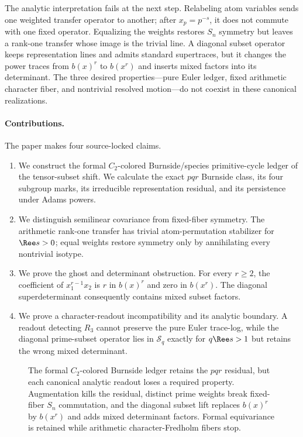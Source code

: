 The analytic interpretation fails at the next step.  Relabeling atom
variables sends one weighted transfer operator to another; after
$x_p=p^{-s}$, it does not commute with one fixed operator.  Equalizing the
weights restores $S_n$ symmetry but leaves a rank-one transfer whose image is
the trivial line.  A diagonal subset operator keeps representation lines and
admits standard supertraces, but it changes the power traces from $b(x)^r$ to
$b(x^r)$ and inserts mixed factors into its determinant.  The three desired
properties---pure Euler ledger, fixed arithmetic character fiber, and
nontrivial resolved motion---do not coexist in these canonical realizations.

\paragraph{Contributions.}
The paper makes four source-locked claims.

\begin{enumerate}
\item We construct the formal $C_2$-colored Burnside/species primitive-cycle
  ledger of the tensor-subset shift.  We calculate the exact $pqr$ Burnside
  class, its four subgroup marks, its irreducible representation residual,
  and its persistence under Adams powers.
\item We distinguish semilinear covariance from fixed-fiber symmetry.  The
  arithmetic rank-one transfer has trivial atom-permutation stabilizer for
  $\Ree s>0$; equal weights restore symmetry only by annihilating every
  nontrivial isotype.
\item We prove the ghost and determinant obstruction.  For every $r\ge2$,
  the coefficient of $x_1^{r-1}x_2$ is $r$ in $b(x)^r$ and zero in $b(x^r)$.
  The diagonal superdeterminant consequently contains mixed subset factors.
\item We prove a character-readout incompatibility and its analytic boundary.
  A readout detecting $R_3$ cannot preserve the pure Euler trace-log, while
  the diagonal prime-subset operator lies in $\mathcal S_q$ exactly for
  $q\Ree s>1$ but retains the wrong mixed determinant.
\end{enumerate}

\begin{figure}[t]
  \centering
  
  \caption{The formal $C_2$-colored Burnside ledger retains the $pqr$
  residual, but each canonical analytic readout loses a required property.
  Augmentation kills the residual, distinct prime weights break fixed-fiber
  $S_n$ commutation, and the diagonal subset lift replaces $b(x)^r$ by
  $b(x^r)$ and adds mixed determinant factors.  Formal equivariance is
  retained while arithmetic character-Fredholm fibers stop.}
  \label{fig:triangle}
\end{figure}

